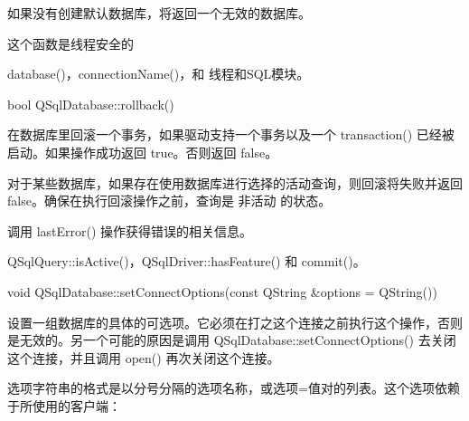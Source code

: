 \begin{notice}
如果没有创建默认数据库，将返回一个无效的数据库。
\end{notice}

\begin{notice}
这个函数是线程安全的
\end{notice}

\begin{seeAlso}
database()，connectionName()，和 线程和SQL模块。
\end{seeAlso}

bool QSqlDatabase::rollback()


在数据库里回滚一个事务，如果驱动支持一个事务以及一个 transaction() 已经被启动。如果操作成功返回 true。否则返回 false。

\begin{notice}
对于某些数据库，如果存在使用数据库进行选择的活动查询，则回滚将失败并返回false。确保在执行回滚操作之前，查询是 非活动 的状态。
\end{notice}

调用 lastError() 操作获得错误的相关信息。

\begin{seeAlso}
QSqlQuery::isActive()，QSqlDriver::hasFeature() 和 commit()。
\end{seeAlso}

void QSqlDatabase::setConnectOptions(const QString \&options = QString())

设置一组数据库的具体的可选项。它必须在打之这个连接之前执行这个操作，否则是无效的。另一个可能的原因是调用 QSqlDatabase::setConnectOptions() 去关闭这个连接，并且调用 open() 再次关闭这个连接。

选项字符串的格式是以分号分隔的选项名称，或选项=值对的列表。这个选项依赖于所使用的客户端：

